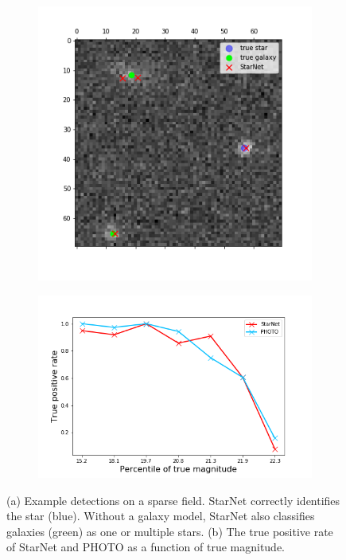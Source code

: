 \begin{figure}
    \centering
    \begin{subfigure}{0.45\textwidth}
        \includegraphics[width=\textwidth]{figures/sparse_field_detections.png}
        \subcaption{}
        \label{fig:sparse_field_detect}
    \end{subfigure}
    \begin{subfigure}{0.54\textwidth}
        \includegraphics[width=\textwidth]{figures/sparse_field_tpr.png}
        \subcaption{}
        \label{fig:sparse_field_tpr}
    \end{subfigure}
    \caption{(a) Example detections on a sparse field. StarNet correctly identifies the star (blue). 
    Without a galaxy model, StarNet also classifies galaxies (green) as one or multiple stars.
    (b) The true positive rate of StarNet and PHOTO as a function of true magnitude. }
    \label{fig:sparse_field}
\end{figure}

